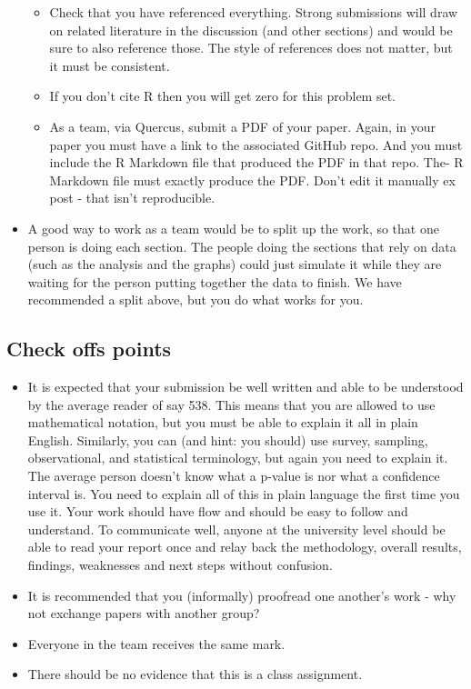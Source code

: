 \documentclass[
]{book}
\providecommand{\tightlist}{%
  \setlength{\itemsep}{0pt}\setlength{\parskip}{0pt}}
\begin{document}
\begin{itemize}
\begin{itemize}
  \item
    Check that you have referenced everything. Strong submissions will draw on related literature in the discussion (and other sections) and would be sure to also reference those. The style of references does not matter, but it must be consistent.
  \item
    If you don't cite R then you will get zero for this problem set.
  \item
    As a team, via Quercus, submit a PDF of your paper. Again, in your paper you must have a link to the associated GitHub repo. And you must include the R Markdown file that produced the PDF in that repo.
    The- R Markdown file must exactly produce the PDF. Don't edit it manually ex post - that isn't reproducible.
  \end{itemize}
\item
  A good way to work as a team would be to split up the work, so that one person is doing each section. The people doing the sections that rely on data (such as the analysis and the graphs) could just simulate it while they are waiting for the person putting together the data to finish. We have recommended a split above, but you do what works for you.
\end{itemize}

\hypertarget{check-offs-points-6}{%
\subsection{Check offs points}\label{check-offs-points-6}}

\begin{itemize}
\tightlist
\item
  It is expected that your submission be well written and able to be understood by the average reader of say 538. This means that you are allowed to use mathematical notation, but you must be able to explain it all in plain English. Similarly, you can (and hint: you should) use survey, sampling, observational, and statistical terminology, but again you need to explain it. The average person doesn't know what a p-value is nor what a confidence interval is. You need to explain all of this in plain language the first time you use it. Your work should have flow and should be easy to follow and understand. To communicate well, anyone at the university level should be able to read your report once and relay back the methodology, overall results, findings, weaknesses and next steps without confusion.
\item
  It is recommended that you (informally) proofread one another's work - why not exchange papers with another group?
\item
  Everyone in the team receives the same mark.
\item
  There should be no evidence that this is a class assignment.
\end{itemize}
\end{document}
